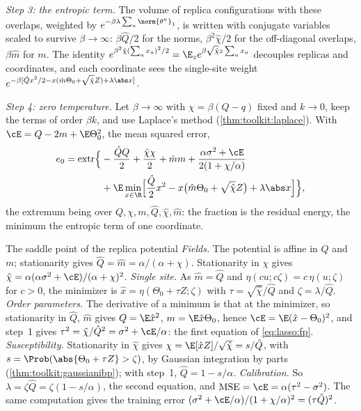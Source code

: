 \begin{refsection}
\begin{heuristic}
\emph{Step 3: the entropic term.} The volume of replica configurations with these overlaps, weighted by $e^{-\beta\lambda\sum_a\norm{\theta^a}_1}$, is written with conjugate variables scaled to survive $\beta\to\infty$: $\beta\hat Q/2$ for the norms, $\beta^2\hat\chi/2$ for the off-diagonal overlaps, $\beta\hat m$ for $m$. The identity $e^{\beta^2\hat\chi(\sum_ax_a)^2/2}=\E_ze^{\beta\sqrt{\hat\chi}z\sum_ax_a}$ decouples replicas and coordinates, and each coordinate sees the single-site weight $e^{-\beta[\hat Qx^2/2-x(\hat m\Theta_0+\sqrt{\hat\chi}Z)+\lambda\abs x]}$.

\emph{Step 4: zero temperature.} Let $\beta\to\infty$ with $\chi=\beta(Q-q)$ fixed and $k\to0$, keep the terms of order $\beta k$, and use Laplace's method (\cref{thm:toolkit:laplace}). With $\cE=Q-2m+\E\Theta_0^2$, the mean squared error,
\begin{equation}\label{eq:lasso:rs}
\begin{split}
e_0=\operatorname*{extr}\Bigl\{&-\frac{\hat QQ}2+\frac{\hat\chi\chi}2+\hat mm+\frac{\alpha\sigma^2+\cE}{2(1+\chi/\alpha)}\\
&+\E\min_{x\in\R}\Bigl[\frac{\hat Q}2x^2-x\bigl(\hat m\Theta_0+\sqrt{\hat\chi}Z\bigr)+\lambda\abs x\Bigr]\Bigr\},
\end{split}
\end{equation}
the extremum being over $Q,\chi,m,\hat Q,\hat\chi,\hat m$: the fraction is the residual energy, the minimum the entropic term of one coordinate.
\end{heuristic}

\begin{computation}{The saddle point of the replica potential}\label{comp:lasso:saddle}
\step \emph{Fields.} The potential is affine in $Q$ and $m$; stationarity gives $\hat Q=\hat m=\alpha/(\alpha+\chi)$. Stationarity in $\chi$ gives $\hat\chi=\alpha(\alpha\sigma^2+\cE)/(\alpha+\chi)^2$.
\step \emph{Single site.} As $\hat m=\hat Q$ and $\eta(cu;c\zeta)=c\,\eta(u;\zeta)$ for $c>0$, the minimizer is $\hat x=\eta(\Theta_0+\tau Z;\zeta)$ with $\tau=\sqrt{\hat\chi}/\hat Q$ and $\zeta=\lambda/\hat Q$.
\step \emph{Order parameters.} The derivative of a minimum is that at the minimizer, so stationarity in $\hat Q$, $\hat m$ gives $Q=\E\hat x^2$, $m=\E\hat x\Theta_0$, hence $\cE=\E(\hat x-\Theta_0)^2$, and step~1 gives $\tau^2=\hat\chi/\hat Q^2=\sigma^2+\cE/\alpha$: the first equation of \eqref{eq:lasso:fp}.
\step \emph{Susceptibility.} Stationarity in $\hat\chi$ gives $\chi=\E[\hat xZ]/\sqrt{\hat\chi}=s/\hat Q$, with $s=\Prob(\abs{\Theta_0+\tau Z}>\zeta)$, by Gaussian integration by parts (\cref{thm:toolkit:gaussianibp}); with step~1, $\hat Q=1-s/\alpha$.
\step \emph{Calibration.} So $\lambda=\zeta\hat Q=\zeta(1-s/\alpha)$, the second equation, and $\mathrm{MSE}=\cE=\alpha(\tau^2-\sigma^2)$. The same computation gives the training error $(\sigma^2+\cE/\alpha)/(1+\chi/\alpha)^2=(\tau\hat Q)^2$.
\end{computation}


\end{refsection}
